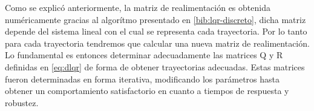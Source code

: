 \documentclass[main]{subfiles}
\begin{document}
Como se explic\'o anteriormente, la matriz de realimentaci\'on es obtenida num\'ericamente gracias al algor\'itmo presentado en \ref{bib:lqr-discreto}, dicha matriz depende del sistema lineal con el cual se representa cada trayectoria. Por lo tanto para cada trayectoria tendremos que calcular una nueva matriz de realimentaci\'on. Lo fundamental es entonces determinar adecuadamente las matrices Q y R definidas en \ref{eq:dlqr} de forma de obtener trayectorias adecuadas. Estas matrices fueron determinadas en forma iterativa, modificando los par\'ametros hasta obtener un comportamiento satisfactorio en cuanto a tiempos de respuesta y robustez.\\
\end{document}
